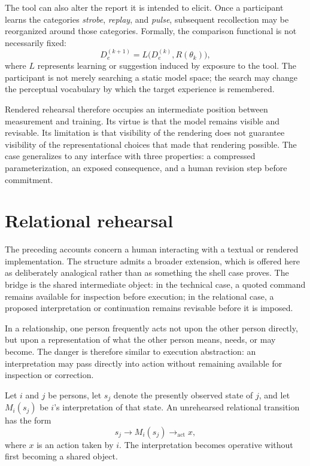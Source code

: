 \documentclass[11pt]{article}
\theoremstyle{remark}
\begin{document}
The tool can also alter the report it is intended to elicit. Once a participant learns the categories \emph{strobe}, \emph{replay}, and \emph{pulse}, subsequent recollection may be reorganized around those categories. Formally, the comparison functional is not necessarily fixed:
\[
D_e^{(k+1)}
=
L\bigl(D_e^{(k)},R(\theta_k)\bigr),
\]
where $L$ represents learning or suggestion induced by exposure to the tool. The participant is not merely searching a static model space; the search may change the perceptual vocabulary by which the target experience is remembered.

Rendered rehearsal therefore occupies an intermediate position between measurement and training. Its virtue is that the model remains visible and revisable. Its limitation is that visibility of the rendering does not guarantee visibility of the representational choices that made that rendering possible. The case generalizes to any interface with three properties: a compressed parameterization, an exposed consequence, and a human revision step before commitment.

\section{Relational rehearsal}

The preceding accounts concern a human interacting with a textual or rendered implementation. The structure admits a broader extension, which is offered here as deliberately analogical rather than as something the shell case proves. The bridge is the shared intermediate object: in the technical case, a quoted command remains available for inspection before execution; in the relational case, a proposed interpretation or continuation remains revisable before it is imposed.

In a relationship, one person frequently acts not upon the other person directly, but upon a representation of what the other person means, needs, or may become. The danger is therefore similar to execution abstraction: an interpretation may pass directly into action without remaining available for inspection or correction.

Let $i$ and $j$ be persons, let $s_j$ denote the presently observed state of $j$, and let $M_i(s_j)$ be $i$'s interpretation of that state. An unrehearsed relational transition has the form
\[
s_j \longrightarrow M_i(s_j)
\longrightarrow_{\mathrm{act}} x,
\]
where $x$ is an action taken by $i$. The interpretation becomes operative without first becoming a shared object.
\end{document}
